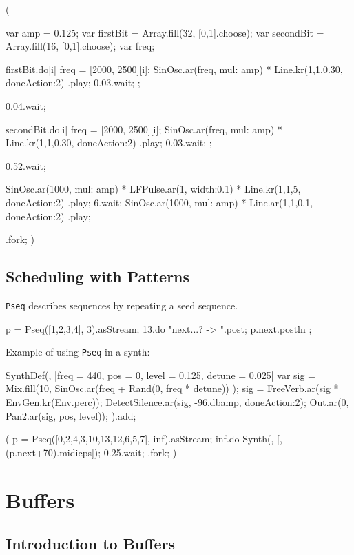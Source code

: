 \begin{supercollider*}
(
{
    var amp = 0.125;
    var firstBit = Array.fill(32, {[0,1].choose});
    var secondBit = Array.fill(16, {[0,1].choose});
    var freq;

    firstBit.do{|i|
        freq = [2000, 2500][i];
        { SinOsc.ar(freq, mul: amp) * Line.kr(1,1,0.30, doneAction:2) }.play;
        0.03.wait;
    };

    0.04.wait;

    secondBit.do{|i|
        freq = [2000, 2500][i];
        { SinOsc.ar(freq, mul: amp) * Line.kr(1,1,0.30, doneAction:2) }.play;
        0.03.wait;
    };

    0.52.wait;

    { SinOsc.ar(1000, mul: amp) * LFPulse.ar(1, width:0.1) * Line.kr(1,1,5, doneAction:2) }.play;
    6.wait;
    { SinOsc.ar(1000, mul: amp) * Line.ar(1,1,0.1, doneAction:2) }.play;
}.fork;
)
\end{supercollider*}

\subsection{Scheduling with Patterns}

\texttt{Pseq} describes sequences by repeating a seed sequence.

\begin{supercollider*}
p = Pseq([1,2,3,4], 3).asStream;
13.do{ "next...? -> ".post; p.next.postln };
\end{supercollider*}

Example of using \texttt{Pseq} in a synth:

\begin{supercollider*}
SynthDef(\sinPerc, { |freq = 440, pos = 0, level = 0.125, detune = 0.025|
    var sig = Mix.fill(10, { SinOsc.ar(freq + Rand(0, freq * detune)) });
    sig = FreeVerb.ar(sig * EnvGen.kr(Env.perc));
    DetectSilence.ar(sig, -96.dbamp, doneAction:2);
    Out.ar(0, Pan2.ar(sig, pos, level));
}).add;

(
p = Pseq([0,2,4,3,10,13,12,6,5,7], inf).asStream;
{
    inf.do{
        Synth(\sinPerc, [\freq, (p.next+70).midicps]);
        0.25.wait;
    }
}.fork;
)
\end{supercollider*}

\section{Buffers}

\subsection{Introduction to Buffers}

